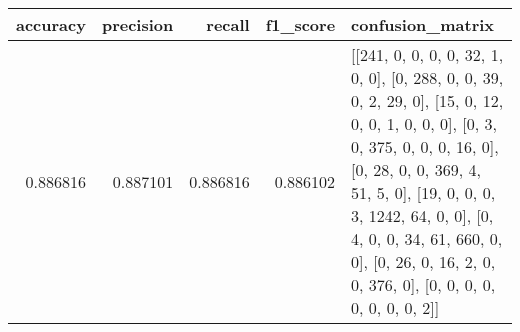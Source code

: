 \begin{tabular}{rrrrl}
\toprule
accuracy & precision & recall & f1_score & confusion_matrix \\
\midrule
0.886816 & 0.887101 & 0.886816 & 0.886102 & [[241, 0, 0, 0, 0, 32, 1, 0, 0], [0, 288, 0, 0, 39, 0, 2, 29, 0], [15, 0, 12, 0, 0, 1, 0, 0, 0], [0, 3, 0, 375, 0, 0, 0, 16, 0], [0, 28, 0, 0, 369, 4, 51, 5, 0], [19, 0, 0, 0, 3, 1242, 64, 0, 0], [0, 4, 0, 0, 34, 61, 660, 0, 0], [0, 26, 0, 16, 2, 0, 0, 376, 0], [0, 0, 0, 0, 0, 0, 0, 0, 2]] \\
\bottomrule
\end{tabular}
